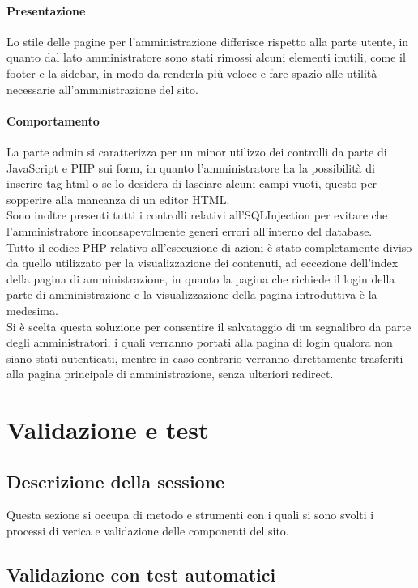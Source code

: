 \documentclass[openany, a4paper, 12pt]{report}
\begin{document}
		\subsubsection{Presentazione}
		Lo stile delle pagine per l'amministrazione differisce rispetto alla parte utente, in quanto dal lato amministratore sono stati rimossi alcuni elementi inutili, come il footer e la sidebar, in modo da renderla più veloce e fare spazio alle utilità necessarie all'amministrazione del sito.
		\subsubsection{Comportamento}
		La parte admin si caratterizza per un minor utilizzo dei controlli da parte di JavaScript e PHP sui form, in quanto l'amministratore ha la possibilità di inserire tag html o se lo desidera di lasciare alcuni campi vuoti, questo per sopperire alla mancanza di un editor HTML.\\
		Sono inoltre presenti tutti i controlli relativi all'SQLInjection per evitare che l'amministratore inconsapevolmente generi errori all'interno del database.\\
		Tutto il codice PHP relativo all'esecuzione di azioni è stato completamente diviso da quello utilizzato per la visualizzazione dei contenuti, ad eccezione dell'index della pagina di amministrazione, in quanto la pagina che richiede il login della parte di amministrazione e la visualizzazione della pagina introduttiva è la medesima.\\
		Si è scelta questa soluzione per consentire il salvataggio di un segnalibro da parte degli amministratori, i quali verranno portati alla pagina di login qualora non siano stati autenticati, mentre in caso contrario verranno direttamente trasferiti alla pagina principale di amministrazione, senza ulteriori redirect.

	\chapter{Validazione e test}
		\section{Descrizione della sessione}
			Questa sezione si occupa di metodo e strumenti con i quali si sono svolti i processi di verica e validazione delle componenti del sito.
		\section{Validazione con test automatici}
\end{document}
